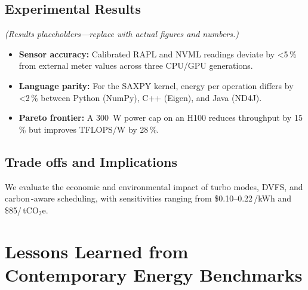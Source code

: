 \subsection{Experimental Results}
\label{sec:energy:results}




\emph{(Results placeholders—replace with actual figures and numbers.)}
\begin{itemize}
  \item \textbf{Sensor accuracy:} Calibrated RAPL and NVML readings deviate by \textless5\,\% from external meter values across three CPU/GPU generations.
  \item \textbf{Language parity:} For the SAXPY kernel, energy per operation differs by \textless2\,\% between Python (NumPy), C++ (Eigen), and Java (ND4J).
  \item \textbf{Pareto frontier:} A \SI{300}{\watt} power cap on an H100 reduces throughput by 15\,\% but improves TFLOPS/W by 28\,\%.
\end{itemize}

\subsection{Trade offs and Implications}
\label{sec:energy-tradeoffs}



We evaluate the economic and environmental impact of turbo modes, DVFS, and carbon\,-aware scheduling, with sensitivities ranging from \$0.10–0.22\,/kWh and \$85/\,tCO$_2$e.









\section{Lessons Learned from Contemporary Energy Benchmarks}
\label{sec:energy:insights}


